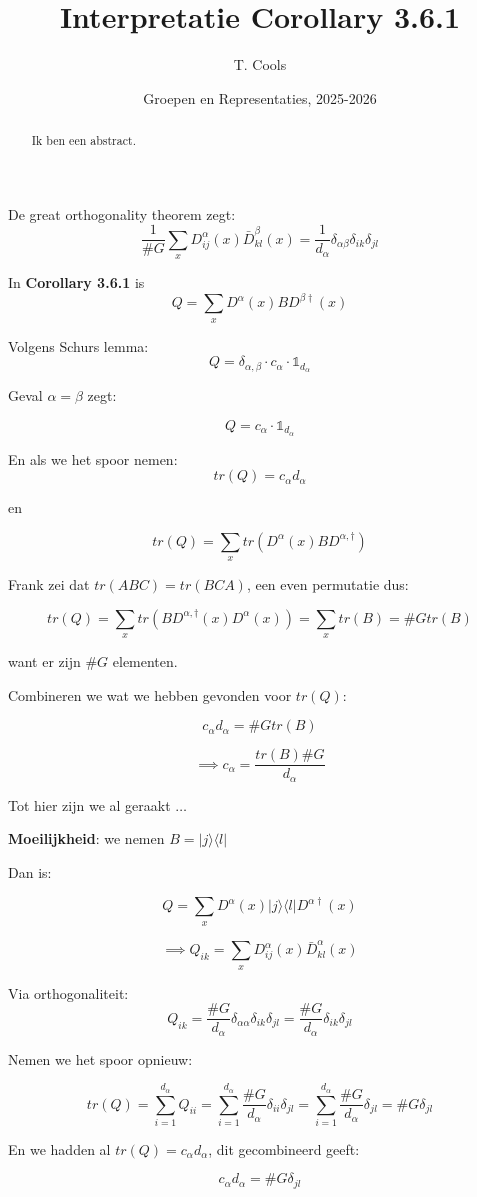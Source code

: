 \documentclass[a4paper,twoside]{article}
\title{Interpretatie Corollary 3.6.1}
\author{T. Cools}
\date{Groepen en Representaties, 2025-2026}
\theoremstyle{definition}
\theoremstyle{plain}
\begin{document}
\maketitle

\begin{abstract}
    Ik ben een abstract.
\end{abstract}

De great orthogonality theorem zegt:
\[
\frac{1}{\#G}\sum_{x} D_{ij}^{\alpha}(x) \bar{D}_{kl}^{\beta}(x) = \frac{1}{d_\alpha} \delta_{\alpha\beta} \delta_{ik} \delta_{jl}
\]

In \textbf{Corollary 3.6.1} is
\[Q = \sum_{x} D^\alpha (x) B D^{\beta \dagger} (x)\]


Volgens Schurs lemma:  \[Q = \delta_{\alpha, \beta} \cdot c_\alpha \cdot \mathds{1}_{d_\alpha}\]





Geval \(\alpha = \beta\) zegt:

\[
Q =  c_\alpha \cdot \mathds{1}_{d_\alpha}
\]

En als we het spoor nemen:
\[tr(Q) = c_\alpha d_\alpha\]

en

\[tr(Q) = \sum_{x} tr(D^\alpha(x)BD^{\alpha, \dagger}) \]

Frank zei dat \(tr(ABC) = tr(BCA)\), een even permutatie dus:

\[tr(Q) = \sum_{x} tr(BD^{\alpha, \dagger}(x) D^\alpha(x)) = \sum_{x} tr(B) = \#Gtr(B) \]

want er zijn \(\#G\) elementen.

Combineren we wat we hebben gevonden voor \(tr(Q)\):

\[c_\alpha d_\alpha = \#G tr(B) \]

\[\implies c_\alpha = \frac{tr(B) \# G}{ d_\alpha}\]


Tot hier zijn we al geraakt \(\dots\)

\textbf{Moeilijkheid}: we nemen \(B = |j \rangle \langle l|\)

Dan is:

 \[Q = \sum_{x} D^\alpha (x) |j \rangle \langle l| D^{\alpha \dagger} (x)\]

\[\implies Q_{ik} = \sum_{x} D^\alpha_{ij}(x) \bar{D}^\alpha_{kl}(x)\]

Via orthogonaliteit:
\[
Q_{ik}
 =
\frac{\#G}{d_\alpha} \delta_{\alpha \alpha} \delta_{ik} \delta_{jl}
=
 \frac{\#G}{d_\alpha} \delta_{ik} \delta_{jl}
\]



Nemen we het spoor opnieuw:

\[tr(Q)
=
 \sum_{i=1}^{d_\alpha}Q_{ii}
 = \sum_{i=1}^{d_\alpha}\frac{\#G}{d_\alpha} \delta_{ii} \delta_{jl}
 = \sum_{i=1}^{d_\alpha}\frac{\#G}{d_\alpha} \delta_{jl}
 = \#G \delta_{jl}
\]

En we hadden al \(tr(Q) = c_\alpha d_\alpha\), dit gecombineerd geeft:

\[c_\alpha d_\alpha = \#G \delta_{jl} \]
\end{document}
